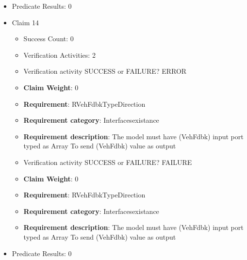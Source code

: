 \documentclass{article}
\begin{document}
\begin{itemize}
\begin{itemize}
					\item Verification activity SUCCESS or FAILURE? SUCCESS
					\item \textbf{Claim Weight}: 0
						\item \textbf{Requirement}: RPoseTypeDirection 
						\item \textbf{Requirement category}: Interfacesexistance 
						\item \textbf{Requirement description}: The model must have (Pose) input port typed as BusVehiclePose To get (Pose) value as input
					
				\end{itemize}
				
									    
				\item Predicate Results: 0

  				  \item Claim 14
				\begin{itemize}
			    	\item Success Count: 0 
			    	\item Verification Activities: 2
					\item Verification activity SUCCESS or FAILURE? ERROR
					\item \textbf{Claim Weight}: 0
						\item \textbf{Requirement}: RVehFdbkTypeDirection 
						\item \textbf{Requirement category}: Interfacesexistance 
						\item \textbf{Requirement description}: The model must have (VehFdbk) input port typed as Array To send (VehFdbk) value as output
					
					\item Verification activity SUCCESS or FAILURE? FAILURE
					\item \textbf{Claim Weight}: 0
						\item \textbf{Requirement}: RVehFdbkTypeDirection 
						\item \textbf{Requirement category}: Interfacesexistance 
						\item \textbf{Requirement description}: The model must have (VehFdbk) input port typed as Array To send (VehFdbk) value as output
					
				\end{itemize}
				
									    
				\item Predicate Results: 0


\end{itemize}
\end{document}
